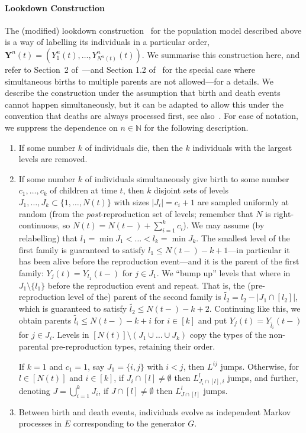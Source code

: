 \documentclass[reqno,draft]{amsart}
\numberwithin{equation}{section}
\theoremstyle{plain}
\theoremstyle{remark}
\newcommand{\N}{\mathbb{N}} %
\begin{document}
\medskip\paragraph{\textbf{Lookdown Construction}}
The (modified) lookdown construction~\cite{DK99,xiflemingviot} for the population model described above is a way of labelling its individuals in a particular order, $\boldsymbol Y^n(t) = (Y^n_1(t), \ldots ,Y^n_{N^n(t)}(t))$. We summarise this construction here, and refer to Section~2 of~\cite{xiflemingviot}---and Section 1.2 of~\cite{DK99} for the special case where simultaneous births to multiple parents are not allowed---for a details. We describe the construction under the assumption that birth and death events cannot happen simultaneously, but it can be adapted to allow this under the convention that deaths are always processed first, see also~\cite{DK99}. For ease of notation, we suppress the dependence on $n\in \N$ for the following description.
\begin{enumerate}
    \item[(i)] If some number $k$ of individuals die, then the $k$ individuals with the largest levels are removed.
    \item[(ii)] If some number $k$ of individuals simultaneously give birth to some number $c_1,\ldots,c_k$ of children at time $t$, then $k$ disjoint sets of levels $J_1,\ldots,J_k \subset \{1,\ldots,N(t)\}$ with sizes $|J_i| = c_i + 1$ are sampled uniformly at random (from the \emph{post}-reproduction set of levels; remember that $N$ is right-continuous, so $N(t) = N(t-) + \sum_{i=1}^k c_i$). We may assume (by relabelling) that $l_1 = \min J_1 < \ldots < l_k = \min J_k$. The smallest level of the first family is guaranteed to satisfy $l_1 \le N(t-) - k + 1$---in particular it has been alive before the reproduction event---and it is the parent of the first family: $Y_j(t) = Y_{l_1}(t-)$ for $j\in J_1$. We ``bump up'' levels that where in $J_1 \setminus \{l_1\}$ before the reproduction event and repeat. That is, the (pre-reproduction level of the) parent of the second family is $\tilde{l_2} = l_2 - |J_1 \cap [l_2]|$, which is guaranteed to satisfy $\tilde{l_2} \le N(t-) - k + 2$. Continuing like this, we obtain parents $\tilde{l_i} \le N(t-) - k + i$ for $i \in [k]$ and put $Y_j(t) = Y_{\tilde{l_i}}(t-)$ for $j\in J_i$. Levels in $[N(t)] \setminus (J_1 \cup \ldots\cup J_k)$ copy the types of the non-parental pre-reproduction types, retaining their order.

    If $k=1$ and $c_1 = 1$, say $J_1 = \{i,j\}$ with $i < j$, then $L^{ij}$ jumps. Otherwise, for $l\in [N(t)]$ and $i\in [k]$, if $J_i \cap [l] \neq \emptyset$ then $L^l_{J_i \cap [l],i}$ jumps, and further, denoting $J = \bigcup_{i=1}^k J_i$, if $J \cap [l] \neq \emptyset$ then $L^l_{J\cap [l]}$ jumps.
    \item[(iii)] Between birth and death events, individuals evolve as independent Markov processes in $E$ corresponding to the generator $G$.
\end{enumerate}
\end{document}
